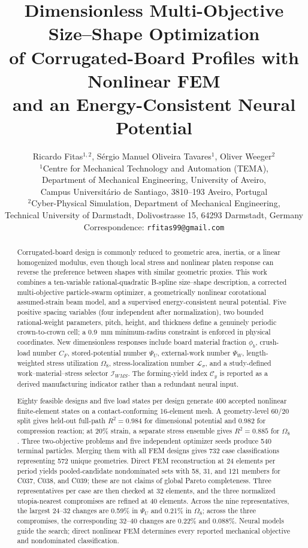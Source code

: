 \documentclass[11pt]{article}
\title{Dimensionless Multi-Objective Size--Shape Optimization\\of Corrugated-Board Profiles with Nonlinear FEM\\and an Energy-Consistent Neural Potential}
\author{Ricardo Fitas$^{1,2}$, S\'ergio Manuel Oliveira Tavares$^1$, Oliver Weeger$^2$\\[3pt]
\small $^1$Centre for Mechanical Technology and Automation (TEMA),\\
\small Department of Mechanical Engineering, University of Aveiro,\\
\small Campus Universit\'ario de Santiago, 3810--193 Aveiro, Portugal\\
\small $^2$Cyber-Physical Simulation, Department of Mechanical Engineering,\\
\small Technical University of Darmstadt, Dolivostrasse 15, 64293 Darmstadt, Germany\\[2pt]
\small Correspondence: \texttt{rfitas99@gmail.com}}
\date{}
\newcommand{\phib}{\phi_{b}}
\newcommand{\PsiU}{\Psi_{U}}
\newcommand{\PsiW}{\Psi_{W}}
\newcommand{\Om}{\Omega_{8}}
\newcommand{\Iws}{\mathcal I_{WMS}}
\begin{document}
\maketitle

\begin{abstract}
Corrugated-board design is commonly reduced to geometric area, inertia, or a linear homogenized modulus, even though local stress and nonlinear platen response can reverse the preference between shapes with similar geometric proxies. This work combines a ten-variable rational-quadratic B-spline size--shape description, a corrected multi-objective particle-swarm optimizer, a geometrically nonlinear corotational assumed-strain beam model, and a supervised energy-consistent neural potential. Five positive spacing variables (four independent after normalization), two bounded rational-weight parameters, pitch, height, and thickness define a genuinely periodic crown-to-crown cell; a 0.9~mm minimum-radius constraint is enforced in physical coordinates. New dimensionless responses include board material fraction $\phib$, crush-load number $C_F$, stored-potential number $\PsiU$, external-work number $\PsiW$, length-weighted stress utilization $\Om$, stress-localization number $\mathcal L_\sigma$, and a study-defined work--material--stress selector $\Iws$. The forming-yield index $\mathcal C_y$ is reported as a derived manufacturing indicator rather than a redundant neural input.

Eighty feasible designs and five load states per design generate 400 accepted nonlinear finite-element states on a contact-conforming 16-element mesh. A geometry-level 60/20 split gives held-out full-path $R^2=0.984$ for dimensional potential and $0.982$ for compression reaction; at 20\% strain, a separate stress ensemble gives $R^2=0.885$ for $\Om$. Three two-objective problems and five independent optimizer seeds produce 540 terminal particles. Merging them with all FEM designs gives 732 case classifications representing 572 unique geometries. Direct FEM reconstruction at 24 elements per period yields pooled-candidate nondominated sets with 58, 31, and 121 members for C037, C038, and C039; these are not claims of global Pareto completeness. Three representatives per case are then checked at 32 elements, and the three normalized utopia-nearest compromises are refined at 40 elements. Across the nine representatives, the largest 24--32 changes are 0.59\% in $\PsiU$ and 0.21\% in $\Om$; across the three compromises, the corresponding 32--40 changes are 0.22\% and 0.088\%. Neural models guide the search; direct nonlinear FEM determines every reported mechanical objective and nondominated classification.
\end{abstract}
\end{document}
